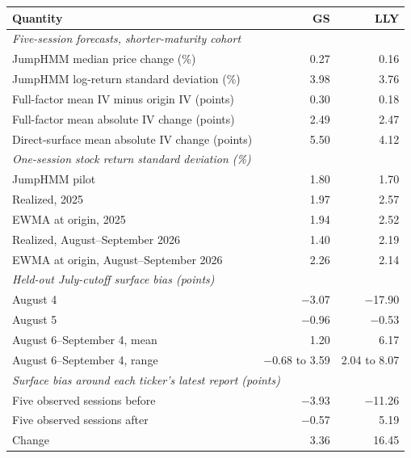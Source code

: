 \begin{tabular}{lrr}
\toprule
Quantity & GS & LLY \\
\midrule
\multicolumn{3}{l}{\textit{Five-session forecasts, shorter-maturity cohort}} \\
JumpHMM median price change (\%) & 0.27 & 0.16 \\
JumpHMM log-return standard deviation (\%) & 3.98 & 3.76 \\
Full-factor mean IV minus origin IV (points) & 0.30 & 0.18 \\
Full-factor mean absolute IV change (points) & 2.49 & 2.47 \\
Direct-surface mean absolute IV change (points) & 5.50 & 4.12 \\
\midrule
\multicolumn{3}{l}{\textit{One-session stock return standard deviation (\%)}} \\
JumpHMM pilot & 1.80 & 1.70 \\
Realized, 2025 & 1.97 & 2.57 \\
EWMA at origin, 2025 & 1.94 & 2.52 \\
Realized, August--September 2026 & 1.40 & 2.19 \\
EWMA at origin, August--September 2026 & 2.26 & 2.14 \\
\midrule
\multicolumn{3}{l}{\textit{Held-out July-cutoff surface bias (points)}} \\
August 4 & $-$3.07 & $-$17.90 \\
August 5 & $-$0.96 & $-$0.53 \\
August 6--September 4, mean & 1.20 & 6.17 \\
August 6--September 4, range & $-$0.68 to 3.59 & 2.04 to 8.07 \\
\midrule
\multicolumn{3}{l}{\textit{Surface bias around each ticker's latest report (points)}} \\
Five observed sessions before & $-$3.93 & $-$11.26 \\
Five observed sessions after & $-$0.57 & 5.19 \\
Change & 3.36 & 16.45 \\
\bottomrule
\end{tabular}
